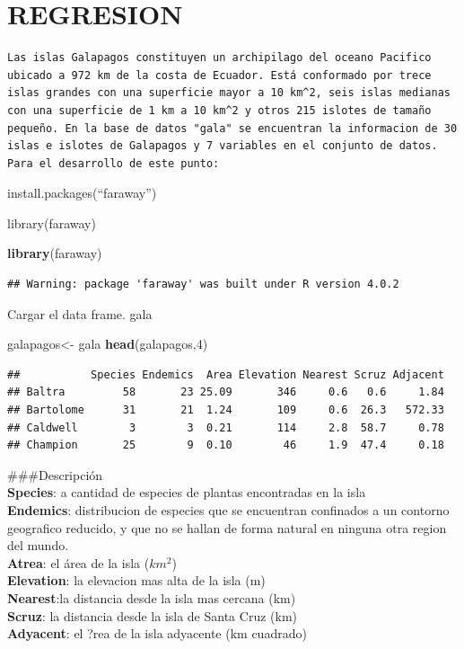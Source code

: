 \documentclass[
]{book}
\newenvironment{Shaded}{\begin{snugshade}}{\end{snugshade}}
\newcommand{\DecValTok}[1]{\textcolor[rgb]{0.00,0.00,0.81}{#1}}
\newcommand{\KeywordTok}[1]{\textcolor[rgb]{0.13,0.29,0.53}{\textbf{#1}}}
\newcommand{\NormalTok}[1]{#1}
\newcommand{\StringTok}[1]{\textcolor[rgb]{0.31,0.60,0.02}{#1}}
\begin{document}
\hypertarget{regresion}{%
\section{REGRESION}\label{regresion}}

\begin{verbatim}
Las islas Galapagos constituyen un archipilago del oceano Pacifico ubicado a 972 km de la costa de Ecuador. Está conformado por trece islas grandes con una superficie mayor a 10 km^2, seis islas medianas con una superficie de 1 km a 10 km^2 y otros 215 islotes de tamaño pequeño. En la base de datos "gala" se encuentran la informacion de 30 islas e islotes de Galapagos y 7 variables en el conjunto de datos. Para el desarrollo de este punto:  
\end{verbatim}

install.packages(``faraway'')

library(faraway)

\begin{Shaded}
\begin{Highlighting}[]
\KeywordTok{library}\NormalTok{(faraway)}
\end{Highlighting}
\end{Shaded}

\begin{verbatim}
## Warning: package 'faraway' was built under R version 4.0.2
\end{verbatim}

Cargar el data frame. gala

\begin{Shaded}
\begin{Highlighting}[]
\NormalTok{galapagos<-}\StringTok{ }\NormalTok{gala}
\KeywordTok{head}\NormalTok{(galapagos,}\DecValTok{4}\NormalTok{)}
\end{Highlighting}
\end{Shaded}

\begin{verbatim}
##           Species Endemics  Area Elevation Nearest Scruz Adjacent
## Baltra         58       23 25.09       346     0.6   0.6     1.84
## Bartolome      31       21  1.24       109     0.6  26.3   572.33
## Caldwell        3        3  0.21       114     2.8  58.7     0.78
## Champion       25        9  0.10        46     1.9  47.4     0.18
\end{verbatim}

\#\#\#Descripción\\
\textbf{Species}: a cantidad de especies de plantas encontradas en la isla\\
\textbf{Endemics}: distribucion de especies que se encuentran confinados a un contorno geografico reducido, y que no se hallan de forma natural en ninguna otra region del mundo.\\
\textbf{Atrea}: el área de la isla (\(km^2\))\\
\textbf{Elevation}: la elevacion mas alta de la isla (m)\\
\textbf{Nearest}:la distancia desde la isla mas cercana (km)\\
\textbf{Scruz}: la distancia desde la isla de Santa Cruz (km)\\
\textbf{Adyacent}: el ?rea de la isla adyacente (km cuadrado)
\end{document}
